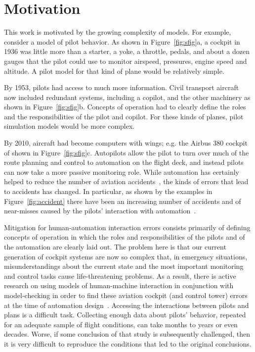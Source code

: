 \documentclass[journal]{IEEEtran}
\newcommand{\fig}[1]{Figure~\ref{fig:#1}}
\begin{document}
\section{Motivation}\label{sec:mot}

This work is motivated by the growing complexity of  models. For example, consider a model of pilot behavior.
As shown in \fig{sfig}a, a cockpit in 1936  was little more than a starter, a yoke, a throttle, pedals, and about a dozen gauges that the pilot could use to monitor airspeed, pressures, engine speed and altitude.  
A pilot model for that kind of plane would be relatively simple.

By 1953, pilots had access to much more information.  
Civil transport aircraft now included redundant systems, including a copilot, and the other machinery as shown in \fig{sfig}b. 
Concepts of operation had to clearly define the roles and the responsibilities of the pilot and copilot. 
For these kinds of planes, pilot simulation models would be more complex.
 
By 2010, aircraft had become computers with wings; e.g. the Airbus 380 cockpit of shown in \fig{sfig}c.
Autopilots allow the pilot to turn over much of the route planning and control to automation on the flight deck, and instead pilots can now take a more passive monitoring role.
While automation has certainly helped to reduce the number of aviation accidents~\cite{Coombs2005}, the kinds of errors that lead to accidents has changed.  
In particular, as shown by the examples in \fig{accident} there have been an increasing number of accidents and of near-misses caused by the pilots' interaction with automation~\cite{Billings1991,Sarter1995,Sarter1997}.

Mitigation for human-automation interaction errors consists primarily of defining concepts of operation in which the roles and responsibilities of the pilots and of the automation are clearly laid out.
The problem here is that our current generation of cockpit systems are now so complex that, in emergency situations, misunderstandings about the current state and the most important monitoring and control tasks cause life-threatening problems.  
As a result, there is active research on using models of human-machine interaction in conjunction with model-checking in order to find these aviation cockpit (and control tower) errors at the time of automation design~\cite{Bolton2011,Rungta2013,Gelman2014}. 
Accessing the interactions between pilots and plans is a difficult task.  
Collecting enough data about pilots' behavior, repeated for an adequate sample of flight conditions, can take months to years or even decades.  
Worse, if some conclusion of that study is subsequently challenged, then it is very difficult to reproduce the conditions that led to the original conclusions.
\end{document}
